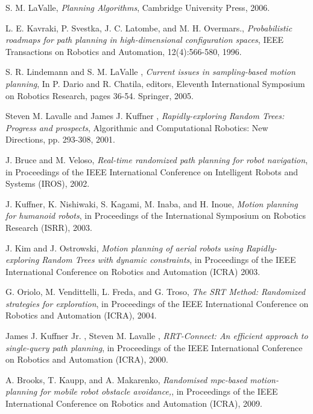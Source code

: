 \documentclass[MTech]{iitmdiss}
\begin{document}
\begin{thebibliography}{99}
	S. M. LaValle,
  \emph{Planning Algorithms},
	Cambridge University Press,
	2006.	 


	L. E. Kavraki, P. Svestka, J. C. Latombe, and M. H. Overmars.,
  \emph{Probabilistic roadmaps for path planning in high-dimensional configuration spaces},
	IEEE Transactions on Robotics and Automation, 12(4):566-580,
	1996.	 

	S. R. Lindemann and S. M. LaValle ,
  \emph{Current issues in sampling-based motion planning},
	In P. Dario and R. Chatila, editors, Eleventh International Symposium on Robotics Research, pages 36-54. Springer,
	2005.	 

	Steven M. Lavalle and James J. Kuffner ,
  \emph{Rapidly-exploring Random Trees: Progress and prospects},
	 Algorithmic and Computational Robotics: New Directions, pp. 293-308,
	2001.	 
	
	J. Bruce and M. Veloso,
  \emph{Real-time randomized path planning for robot navigation},
	in Proceedings of the IEEE International Conference on Intelligent Robots and Systems (IROS),
	2002.	 
	
	J. Kuffner, K. Nishiwaki, S. Kagami, M. Inaba, and H. Inoue,
  \emph{Motion planning for humanoid robots},
	in Proceedings of the International Symposium on Robotics Research (ISRR),
	2003.	 
	

	J. Kim and J. Ostrowski,
  \emph{Motion planning of aerial robots using Rapidly-exploring Random Trees with dynamic constraints},
	in Proceedings of the IEEE International Conference on Robotics and Automation (ICRA)
	2003.	 
	

	 G. Oriolo, M. Vendittelli, L. Freda, and G. Troso,
  \emph{The SRT Method: Randomized strategies for exploration},
	in Proceedings of the IEEE International Conference on Robotics and Automation (ICRA),
	2004.	 


	 James J. Kuffner Jr. , Steven M. Lavalle ,
  \emph{RRT-Connect: An efficient approach to single-query path planning},
	in Proceedings of the IEEE International Conference on Robotics and Automation (ICRA),
	2000.	

	 A. Brooks, T. Kaupp, and A. Makarenko,
  \emph{Randomised mpc-based motion-planning for mobile robot obstacle avoidance,},
	in Proceedings of the IEEE International Conference on Robotics and Automation (ICRA),
	2009.	


\end{thebibliography}
\end{document}
